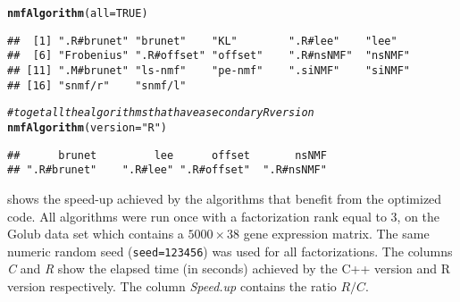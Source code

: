 \documentclass[a4paper]{article}\usepackage[]{graphicx}\usepackage[]{color}
\makeatletter
\newcommand{\hlnum}[1]{\textcolor[rgb]{0.686,0.059,0.569}{#1}}%
\newcommand{\hlstr}[1]{\textcolor[rgb]{0.192,0.494,0.8}{#1}}%
\newcommand{\hlcom}[1]{\textcolor[rgb]{0.678,0.584,0.686}{\textit{#1}}}%
\newcommand{\hlstd}[1]{\textcolor[rgb]{0.345,0.345,0.345}{#1}}%
\newcommand{\hlkwc}[1]{\textcolor[rgb]{0.333,0.667,0.333}{#1}}%
\newcommand{\hlkwd}[1]{\textcolor[rgb]{0.737,0.353,0.396}{\textbf{#1}}}%
\newenvironment{kframe}{%
 \def\at@end@of@kframe{}%
 \ifinner\ifhmode%
  \def\at@end@of@kframe{\end{minipage}}%
  \begin{minipage}{\columnwidth}%
 \fi\fi%
 \def\FrameCommand##1{\hskip\@totalleftmargin \hskip-\fboxsep
 \colorbox{shadecolor}{##1}\hskip-\fboxsep
     \hskip-\linewidth \hskip-\@totalleftmargin \hskip\columnwidth}%
 \MakeFramed {\advance\hsize-\width
   \@totalleftmargin\z@ \linewidth\hsize
   \@setminipage}}%
 {\par\unskip\endMakeFramed%
 \at@end@of@kframe}
\newenvironment{knitrout}{}{} %
\let\code=\texttt
\makeatother
\begin{document}
\begin{knitrout}
\color{fgcolor}\begin{kframe}
\begin{alltt}
\hlkwd{nmfAlgorithm}\hlstd{(}\hlkwc{all} \hlstd{=} \hlnum{TRUE}\hlstd{)}
\end{alltt}
\begin{verbatim}
##  [1] ".R#brunet" "brunet"    "KL"        ".R#lee"    "lee"      
##  [6] "Frobenius" ".R#offset" "offset"    ".R#nsNMF"  "nsNMF"    
## [11] ".M#brunet" "ls-nmf"    "pe-nmf"    ".siNMF"    "siNMF"    
## [16] "snmf/r"    "snmf/l"
\end{verbatim}
\begin{alltt}
\hlcom{# to get all the algorithms that have a secondary R version}
\hlkwd{nmfAlgorithm}\hlstd{(}\hlkwc{version} \hlstd{=} \hlstr{"R"}\hlstd{)}
\end{alltt}
\begin{verbatim}
##      brunet         lee      offset       nsNMF 
## ".R#brunet"    ".R#lee" ".R#offset"  ".R#nsNMF"
\end{verbatim}
\end{kframe}
\end{knitrout}


 shows the speed-up achieved by the algorithms that benefit from the optimized code.
All algorithms were run once with a factorization rank equal to 3, on the Golub data set which contains a $5000\times 38$ gene expression matrix. 
The same numeric random seed (\code{seed=123456}) was used for all factorizations.
The columns \emph{C} and \emph{R} show the elapsed time (in seconds) achieved by the C++ version and R version respectively.
The column \emph{Speed.up} contains the ratio $R/C$. 
\end{document}
